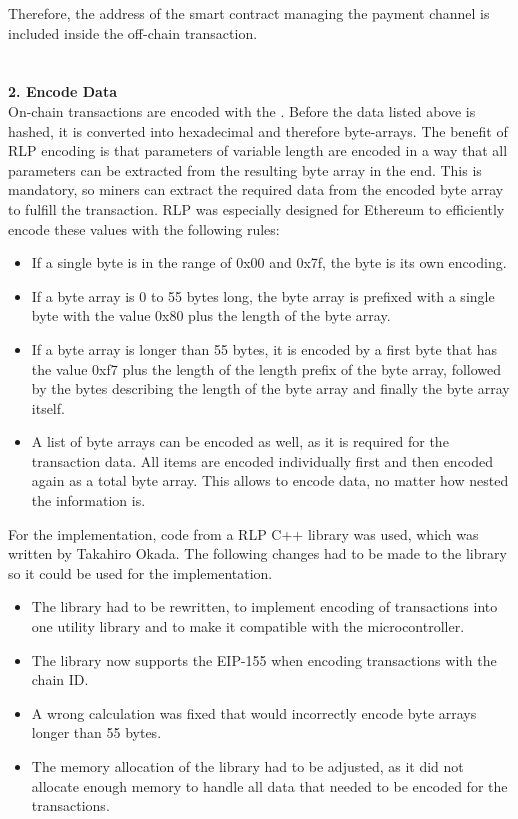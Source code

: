 Therefore, the address of the smart contract managing the payment channel is included inside the off-chain transaction.
\\\\\\
\textbf{2. Encode Data}\\
On-chain transactions are encoded with the \cite{ethereum-yellow-paper}.
Before the data listed above is hashed, it is converted into hexadecimal and therefore byte-arrays.
The benefit of RLP encoding is that parameters of variable length are encoded in a way that all parameters can be extracted from the resulting byte array in the end.
This is mandatory, so miners can extract the required data from the encoded byte array to fulfill the transaction.
RLP was especially designed for Ethereum to efficiently encode these values with the following rules: 
\begin{itemize}
  \item If a single byte is in the range of 0x00 and 0x7f, the byte is its own encoding.
  \item If a byte array is 0 to 55 bytes long, the byte array is prefixed with a single byte with the value 0x80 plus the length of the byte array.
  \item If a byte array is longer than 55 bytes, it is encoded by a first byte that has the value 0xf7 plus the length of the length prefix of the byte array, followed by the bytes describing the length of the byte array and finally the byte array itself.
  \item A list of byte arrays can be encoded as well, as it is required for the transaction data.
  All items are encoded individually first and then encoded again as a total byte array.
  This allows to encode data, no matter how nested the information is.
\end{itemize}
For the implementation, code from a RLP C++ library was used, which was written by Takahiro Okada\cite{rlp-lib}.
The following changes had to be made to the library so it could be used for the implementation.
\begin{itemize}
  \item The library had to be rewritten, to implement encoding of transactions into one utility library and to make it compatible with the microcontroller.
  \item The library now supports the EIP-155\cite{eip-155} when encoding transactions with the chain ID.
  \item A wrong calculation was fixed that would incorrectly encode byte arrays longer than 55 bytes.
  \item The memory allocation of the library had to be adjusted, as it did not allocate enough memory to handle all data that needed to be encoded for the transactions.
\end{itemize}
